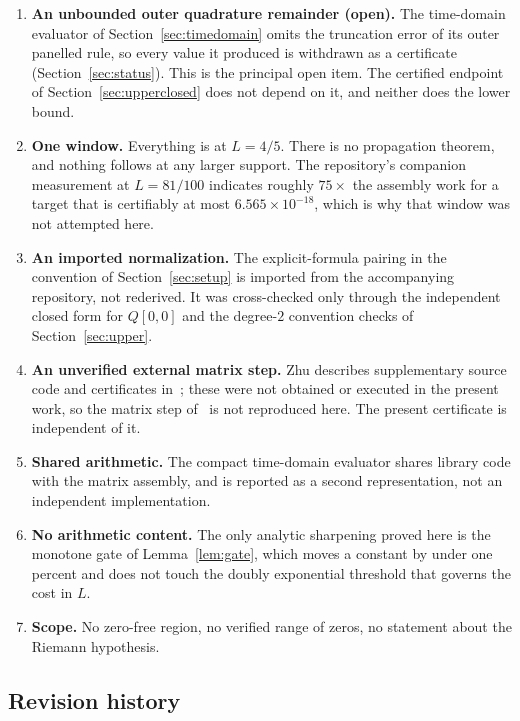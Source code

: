 \documentclass[11pt,a4paper]{article}
\theoremstyle{definition}
\theoremstyle{remark}
\begin{document}
\begin{enumerate}
\item \textbf{An unbounded outer quadrature remainder (open).} The time-domain
  evaluator of Section~\ref{sec:timedomain} omits the truncation error of its
  outer panelled rule, so every value it produced is withdrawn as a certificate
  (Section~\ref{sec:status}). This is the principal open item. The certified
  endpoint of Section~\ref{sec:upperclosed} does not depend on it, and neither
  does the lower bound.
\item \textbf{One window.} Everything is at $L = 4/5$. There is no propagation
  theorem, and nothing follows at any larger support. The repository's companion
  measurement at $L = 81/100$ indicates roughly $75\times$ the assembly work for
  a target that is certifiably at most $6.565\times10^{-18}$, which is why that
  window was not attempted here.
\item \textbf{An imported normalization.} The explicit-formula pairing in the
  convention of Section~\ref{sec:setup} is imported from the accompanying
  repository, not rederived. It was cross-checked only through the independent
  closed form for $Q[0,0]$ and the degree-$2$ convention checks of
  Section~\ref{sec:upper}.
\item \textbf{An unverified external matrix step.} Zhu describes supplementary
  source code and certificates in~\cite[\S17]{Zhu}; these were not obtained or
  executed in the present work, so the matrix step of~\cite[Thm.~1.1]{Zhu} is
  not reproduced here. The present certificate is independent of it.
\item \textbf{Shared arithmetic.} The compact time-domain evaluator shares
  library code with the matrix assembly, and is reported as a second
  representation, not an independent implementation.
\item \textbf{No arithmetic content.} The only analytic sharpening proved here
  is the monotone gate of Lemma~\ref{lem:gate}, which moves a constant by under
  one percent and does not touch the doubly exponential threshold that governs
  the cost in $L$.
\item \textbf{Scope.} No zero-free region, no verified range of zeros, no
  statement about the Riemann hypothesis.
\end{enumerate}

\subsection{Revision history}
\end{document}
